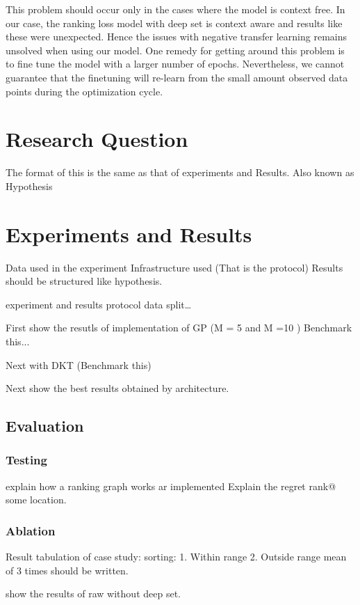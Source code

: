 \documentclass[11pt]{report}
\begin{document}
This problem should occur only in the cases where the model is context free.
In our case,  the ranking loss model with deep set is context aware and results like these were unexpected.
Hence the issues with negative transfer learning remains unsolved when using our model.
One remedy for getting around this problem is to fine tune the model with a larger number of epochs.
Nevertheless,  we cannot guarantee that the finetuning will re-learn from the small amount observed data points during the optimization cycle.

\chapter{Research Question}
The format of this is the same as that of experiments and Results.
Also known as Hypothesis

\chapter{Experiments and Results}

Data used in the experiment
Infrastructure used
(That is the protocol)
Results should be structured like hypothesis.

experiment and results
protocol
data split…

First show the resutls of implementation of GP (M = 5 and M =10 )
Benchmark this...

Next with DKT (Benchmark this)

Next show the best results obtained by architecture.

\section{Evaluation}
\subsection{Testing}
explain how a ranking graph works ar implemented
Explain the regret rank@ some location.

\subsection{Ablation}

Result tabulation of case study: sorting:
1.  Within range
2.   Outside range 
mean of 3 times should be written.

show the results of raw without deep set.
\end{document}
